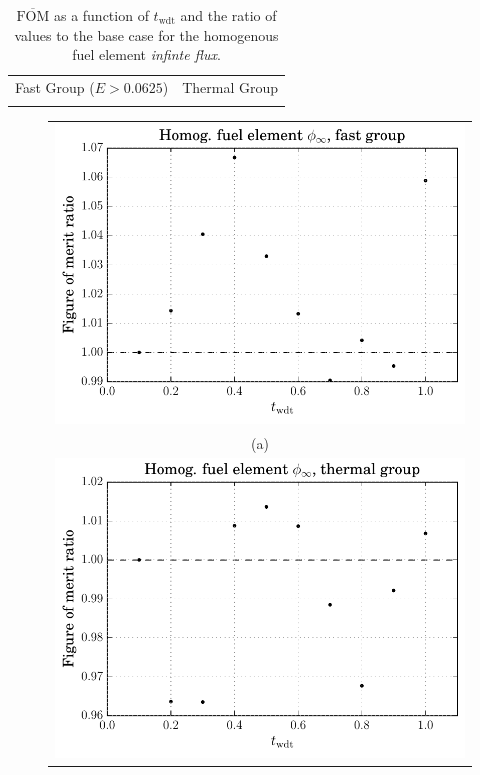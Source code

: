 \begin{table}[hbtp]
  \centering
  \caption[$\overline{\mathrm{FOM}}$ and ratio for
    the homogenous fuel element \textit{infinte flux}.]{$\overline{\mathrm{FOM}}$ as a function of
    $t_{\mathrm{wdt}}$ and the ratio of values to the base case for
    the homogenous fuel element \textit{infinte flux}.}
  \begin{tabular}{cc} Fast Group ($E > 0.0625$) & Thermal Group \\
    
 &
   
  \end{tabular}
\label{tab:homog_inf_flx}
\end{table}
\begin{figure}[hbtp]
  \centering
  \begin{tabular}{c}
  \includegraphics[scale=0.9]{images/results/homog_inf_flx_grp_comb1} \\
    (a) \\
  \includegraphics[scale=0.9]{images/results/homog_inf_flx_grp_comb2} \\

\end{tabular}
\end{figure}
